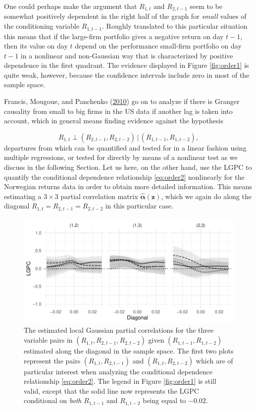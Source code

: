 \documentclass[
  12pt,
  letterpaper]{article}
\newcommand{\z}{\bm{z}}
\newcommand{\hfalpha}{\widehat{\bm{\alpha}}}
\theoremstyle{definition}
\theoremstyle{definition}
\theoremstyle{definition}
\theoremstyle{remark}
\begin{document}
One could perhaps make the argument that \(R_{1,t}\) and \(R_{2,t-1}\) seem to be somewhat positively dependent in the right half of the graph for \emph{small} values of the conditioning variable \(R_{1,t-1}\). Roughly translated to this particular situation this means that if the large-firm portfolio gives a negative return on day \(t-1\), then its value on day \(t\) depend on the performance small-firm portfolio on day \(t-1\) in a nonlinear and non-Gaussian way that is characterized by positive dependence in the first quadrant. The evidence displayed in Figure \ref{fig:order1} is quite weak, however, because the confidence intervals include zero in most of the sample space.

Francis, Mougoue, and Panchenko (\protect\hyperlink{ref-fran:moug:vale:2010}{2010}) go on to analyze if there is Granger causality from small to big firms in the US data if another lag is taken into account, which in general means finding evidence against the hypothesis

\begin{equation}
R_{1,t} \perp (R_{2,t-1}, R_{2, t-2}) \,|\, (R_{1, t-1}, R_{1, t-2}),
\label{eq:order2}
\end{equation}
departures from which can be quantified and tested for in a linear fashion using multiple regressions, or tested for directly by means of a nonlinear test as we discuss in the following Section. Let us here, on the other hand, use the LGPC to quantify the conditional dependence relationship \eqref{eq:order2} nonlinearly for the Norwegian returns data in order to obtain more detailed information. This means estimating a \(3\times3\) partial correlation matrix \(\hfalpha(\z)\), which we again do along the diagonal \(R_{1,t} = R_{2,t-1} = R_{2, t-2}\) in this particular case.

\begin{figure}[t]
\centering
\includegraphics{granger-order2}
\caption{The estimated local Gaussian partial correlations for the three variable pairs in $(R_{1,t}, R_{2,t-1}, R_{2, t-2})$ given $(R_{1, t-1}, R_{1, t-2})$ estimated along the diagonal in the sample space. The first two plots represent the pairs $(R_{1,t}, R_{2,t-1})$ and $(R_{1,t}, R_{2,t-2})$ which are of particular interest when analyzing the conditional dependence relationship \eqref{eq:order2}. The legend in Figure \ref{fig:order1} is still valid, except that the solid line now represents the LGPC conditional on \emph{both} $R_{1, t-1}$ and $R_{1, t-2}$ being equal to $-0.02$.}
\label{fig:order2}
\end{figure}
\end{document}
